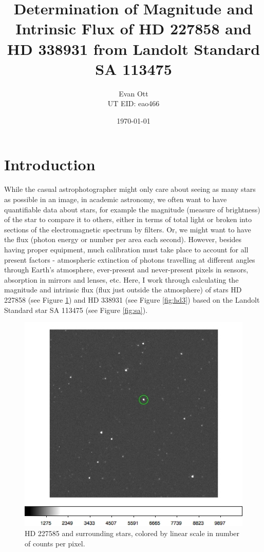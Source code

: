\documentclass{article}
\title{Determination of Magnitude and Intrinsic Flux of HD 227858 and HD 338931 from Landolt Standard SA 113475}
\author{Evan Ott \\ UT EID: eao466}
\date{\today}
\begin{document}
\maketitle
\section{Introduction}
While the casual astrophotographer might only care about seeing as many stars as possible in an image, in academic astronomy,
we often want to have quantifiable data about stars, for example the magnitude (measure of brightness) of the star to compare it
to others, either in terms of total light or broken into sections of the electromagnetic spectrum by filters. Or, we might want to
have the flux (photon energy or number per area each second). However, besides having proper equipment, much calibration
must take place to account for all present factors - atmospheric extinction of photons travelling at different angles
through Earth's atmosphere, ever-present and never-present pixels in sensors, absorption in mirrors and lenses, etc. Here, I work through calculating the magnitude and intrinsic flux (flux just outside the atmosphere) of stars HD 227858 (see Figure \ref{fig:hd2})
and HD 338931 (see Figure \ref{fig:hd3}) based on the Landolt Standard star SA 113475 (see Figure \ref{fig:sa})\cite{landolt}. 

\begin{figure}[h]
\centering
\includegraphics[scale=.75]{hd2.jpg}
\caption{\label{fig:hd2} HD 227585 and surrounding stars, colored by linear scale in number of counts per pixel.}
\end{figure}
\end{document}
